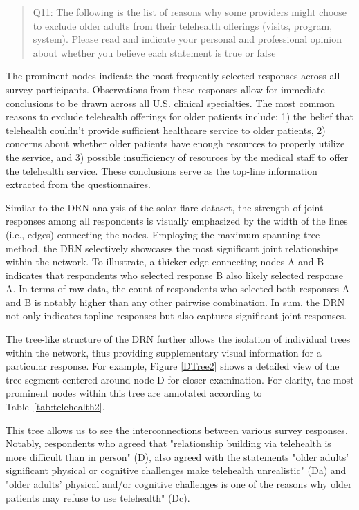 \begin{quotation}
\noindent Q11: The following is the list of reasons why some providers might choose to exclude older adults from their telehealth offerings (visits, program, system). Please read and indicate your personal and professional opinion about whether you believe each statement is true or false
\end{quotation}

The prominent nodes indicate the most frequently selected responses across all survey participants. Observations from these responses allow for immediate conclusions to be drawn across all U.S. clinical specialties. The most common reasons to exclude telehealth offerings for older patients include: 1) the belief that telehealth couldn't provide sufficient healthcare service to older patients, 2) concerns about whether older patients have enough resources to properly utilize the service, and 3) possible insufficiency of resources by the medical staff to offer the telehealth service. These conclusions serve as the top-line information extracted from the questionnaires.

Similar to the DRN analysis of the solar flare dataset, the strength of joint responses among all respondents is visually emphasized by the width of the lines (i.e., edges) connecting the nodes. Employing the maximum spanning tree method, the DRN selectively showcases the most significant joint relationships within the network. To illustrate, a thicker edge connecting nodes A and B indicates that respondents who selected response B also likely selected response A. In terms of raw data, the count of respondents who selected both responses A and B is notably higher than any other pairwise combination. In sum, the DRN not only indicates topline responses but also captures significant joint responses.

The tree-like structure of the DRN further allows the isolation of individual trees within the network, thus providing supplementary visual information for a particular response. For example, Figure \ref{DTree2} shows a detailed view of the tree segment centered around node D for closer examination.  For clarity, the most prominent nodes within this tree are annotated according to Table~\ref{tab:telehealth2}.

This tree allows us to see the interconnections between various survey responses. Notably, respondents who agreed that "relationship building via telehealth is more difficult than in person" (D), also agreed with the statements "older adults’ significant physical or cognitive challenges make telehealth unrealistic" (Da) and "older adults’ physical and/or cognitive challenges is one of the reasons why older patients may refuse to use telehealth" (Dc).

